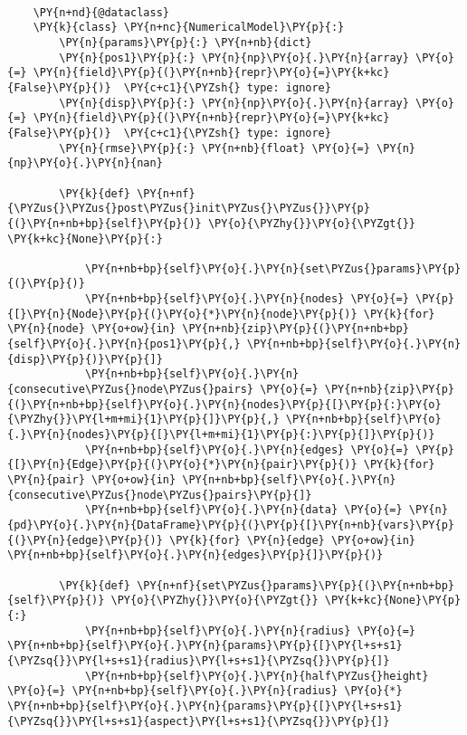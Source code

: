 \begin{tcolorbox}[breakable, size=fbox, boxrule=1pt, pad at break*=1mm,colback=cellbackground, colframe=cellborder]
\begin{Verbatim}[commandchars=\\\{\}]
    
    \PY{n+nd}{@dataclass}
    \PY{k}{class} \PY{n+nc}{NumericalModel}\PY{p}{:}
        \PY{n}{params}\PY{p}{:} \PY{n+nb}{dict}
        \PY{n}{pos1}\PY{p}{:} \PY{n}{np}\PY{o}{.}\PY{n}{array} \PY{o}{=} \PY{n}{field}\PY{p}{(}\PY{n+nb}{repr}\PY{o}{=}\PY{k+kc}{False}\PY{p}{)}  \PY{c+c1}{\PYZsh{} type: ignore}
        \PY{n}{disp}\PY{p}{:} \PY{n}{np}\PY{o}{.}\PY{n}{array} \PY{o}{=} \PY{n}{field}\PY{p}{(}\PY{n+nb}{repr}\PY{o}{=}\PY{k+kc}{False}\PY{p}{)}  \PY{c+c1}{\PYZsh{} type: ignore}
        \PY{n}{rmse}\PY{p}{:} \PY{n+nb}{float} \PY{o}{=} \PY{n}{np}\PY{o}{.}\PY{n}{nan}
    
        \PY{k}{def} \PY{n+nf}{\PYZus{}\PYZus{}post\PYZus{}init\PYZus{}\PYZus{}}\PY{p}{(}\PY{n+nb+bp}{self}\PY{p}{)} \PY{o}{\PYZhy{}}\PY{o}{\PYZgt{}} \PY{k+kc}{None}\PY{p}{:}
    
            \PY{n+nb+bp}{self}\PY{o}{.}\PY{n}{set\PYZus{}params}\PY{p}{(}\PY{p}{)}
            \PY{n+nb+bp}{self}\PY{o}{.}\PY{n}{nodes} \PY{o}{=} \PY{p}{[}\PY{n}{Node}\PY{p}{(}\PY{o}{*}\PY{n}{node}\PY{p}{)} \PY{k}{for} \PY{n}{node} \PY{o+ow}{in} \PY{n+nb}{zip}\PY{p}{(}\PY{n+nb+bp}{self}\PY{o}{.}\PY{n}{pos1}\PY{p}{,} \PY{n+nb+bp}{self}\PY{o}{.}\PY{n}{disp}\PY{p}{)}\PY{p}{]}
            \PY{n+nb+bp}{self}\PY{o}{.}\PY{n}{consecutive\PYZus{}node\PYZus{}pairs} \PY{o}{=} \PY{n+nb}{zip}\PY{p}{(}\PY{n+nb+bp}{self}\PY{o}{.}\PY{n}{nodes}\PY{p}{[}\PY{p}{:}\PY{o}{\PYZhy{}}\PY{l+m+mi}{1}\PY{p}{]}\PY{p}{,} \PY{n+nb+bp}{self}\PY{o}{.}\PY{n}{nodes}\PY{p}{[}\PY{l+m+mi}{1}\PY{p}{:}\PY{p}{]}\PY{p}{)}
            \PY{n+nb+bp}{self}\PY{o}{.}\PY{n}{edges} \PY{o}{=} \PY{p}{[}\PY{n}{Edge}\PY{p}{(}\PY{o}{*}\PY{n}{pair}\PY{p}{)} \PY{k}{for} \PY{n}{pair} \PY{o+ow}{in} \PY{n+nb+bp}{self}\PY{o}{.}\PY{n}{consecutive\PYZus{}node\PYZus{}pairs}\PY{p}{]}
            \PY{n+nb+bp}{self}\PY{o}{.}\PY{n}{data} \PY{o}{=} \PY{n}{pd}\PY{o}{.}\PY{n}{DataFrame}\PY{p}{(}\PY{p}{[}\PY{n+nb}{vars}\PY{p}{(}\PY{n}{edge}\PY{p}{)} \PY{k}{for} \PY{n}{edge} \PY{o+ow}{in} \PY{n+nb+bp}{self}\PY{o}{.}\PY{n}{edges}\PY{p}{]}\PY{p}{)}
    
        \PY{k}{def} \PY{n+nf}{set\PYZus{}params}\PY{p}{(}\PY{n+nb+bp}{self}\PY{p}{)} \PY{o}{\PYZhy{}}\PY{o}{\PYZgt{}} \PY{k+kc}{None}\PY{p}{:}
            \PY{n+nb+bp}{self}\PY{o}{.}\PY{n}{radius} \PY{o}{=} \PY{n+nb+bp}{self}\PY{o}{.}\PY{n}{params}\PY{p}{[}\PY{l+s+s1}{\PYZsq{}}\PY{l+s+s1}{radius}\PY{l+s+s1}{\PYZsq{}}\PY{p}{]}
            \PY{n+nb+bp}{self}\PY{o}{.}\PY{n}{half\PYZus{}height} \PY{o}{=} \PY{n+nb+bp}{self}\PY{o}{.}\PY{n}{radius} \PY{o}{*} \PY{n+nb+bp}{self}\PY{o}{.}\PY{n}{params}\PY{p}{[}\PY{l+s+s1}{\PYZsq{}}\PY{l+s+s1}{aspect}\PY{l+s+s1}{\PYZsq{}}\PY{p}{]}
    

\end{Verbatim}
\end{tcolorbox}
